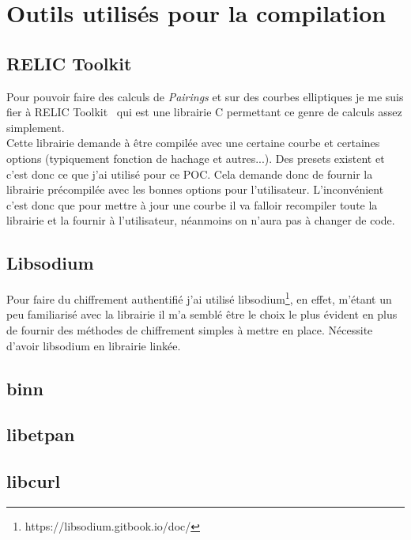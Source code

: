\chapter{Outils utilisés pour la compilation}

\section{RELIC Toolkit}
Pour pouvoir faire des calculs de \textit{Pairings} et sur des courbes elliptiques je me suis fier à RELIC Toolkit~\cite{relic-toolkit} qui est une librairie C permettant ce genre de calculs assez simplement.\\
Cette librairie demande à être compilée avec une certaine courbe et certaines options (typiquement fonction de hachage et autres...). Des presets existent et c'est donc ce que j'ai utilisé pour ce POC. Cela demande donc de fournir la librairie précompilée avec les bonnes options pour l'utilisateur. L'inconvénient c'est donc que pour mettre à jour une courbe il va falloir recompiler toute la librairie et la fournir à l'utilisateur, néanmoins on n'aura pas à changer de code.

\section{Libsodium}
Pour faire du chiffrement authentifié j'ai utilisé libsodium\footnote{https://libsodium.gitbook.io/doc/}, en effet, m'étant un peu familiarisé avec la librairie il m'a semblé être le choix le plus évident en plus de fournir des méthodes de chiffrement simples à mettre en place. Nécessite d'avoir libsodium en librairie linkée.

\section{binn}
\section{libetpan}
\section{libcurl}